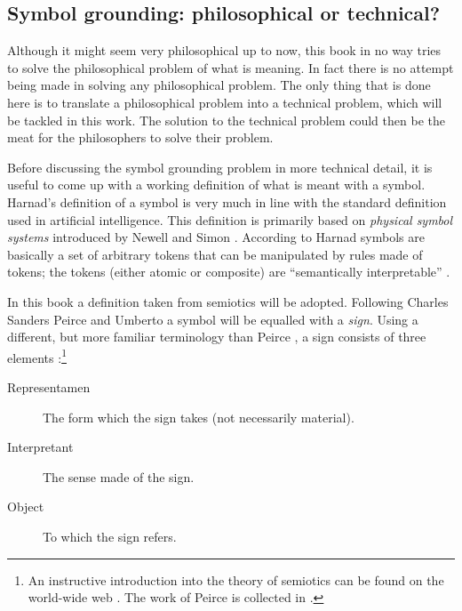 \subsection{Symbol grounding: philosophical or technical?}

\label{s:intro:semiotic}

Although it might seem very philosophical up to now, this book in no way tries to solve the philosophical problem of what is meaning. In fact there is no attempt being made in solving any philosophical problem. The only thing that is done here is to translate a philosophical problem into a technical problem, which will be tackled in this work. The solution to the technical problem could then be the meat for the philosophers to solve their problem.


Before discussing the symbol grounding problem in more technical detail, it is useful to come up with a working definition of what is meant with a symbol. Harnad's definition of a symbol is very much in line with the standard definition used in artificial intelligence. This definition is primarily based on {\em physical symbol systems} introduced by Newell and Simon \citet{newell:1980,newell:1990}. According to Harnad symbols are basically a set of arbitrary tokens that can be manipulated by rules made of tokens; the tokens (either atomic or composite) are ``semantically interpretable'' \citep{harnad:1990}.


In this book a definition taken from semiotics will be adopted. Following Charles Sanders Peirce and Umberto \citet{eco:1976,eco:1986} a symbol will be equalled with a {\em sign}. Using a different, but more familiar terminology than Peirce  \citet{noth:1990}, a sign consists of three elements \citep{chandler:1994}:\footnote{An instructive introduction into the theory of semiotics can be found on the world-wide web \citep{chandler:1994}. The work of Peirce is collected in \citealt{peirce:1931}.}

\begin{description}
\item[Representamen] The form which the sign takes (not necessarily material).
\item[Interpretant] The sense made of the sign.
\item[Object] To which the sign refers. 
\end{description}

